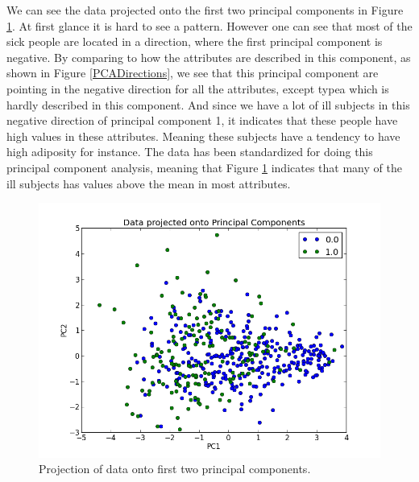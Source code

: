 We can see the data projected onto the first two principal components in Figure \ref{PCAProjected}. At first glance it is hard to see a pattern. However one can see that most of the sick people are located in a direction, where the first principal component is negative. By comparing to how the attributes are described in this component, as shown in Figure \ref{PCADirections}, we see that this principal component are pointing in the negative direction for all the attributes, except typea which is hardly described in this component. And since we have a lot of ill subjects in this negative direction of principal component 1, it indicates that these people have high values in these attributes. Meaning these subjects have a tendency to have high adiposity for instance. The data has been standardized for doing this principal component analysis, meaning that Figure \ref{PCAProjected} indicates that many of the ill subjects has values above the mean in most attributes.

\begin{figure}[H]
\includegraphics[scale=0.75]{pictures/projectedToPCA.png}
\caption{Projection of data onto first two principal components.}
\label{PCAProjected}
\end{figure}